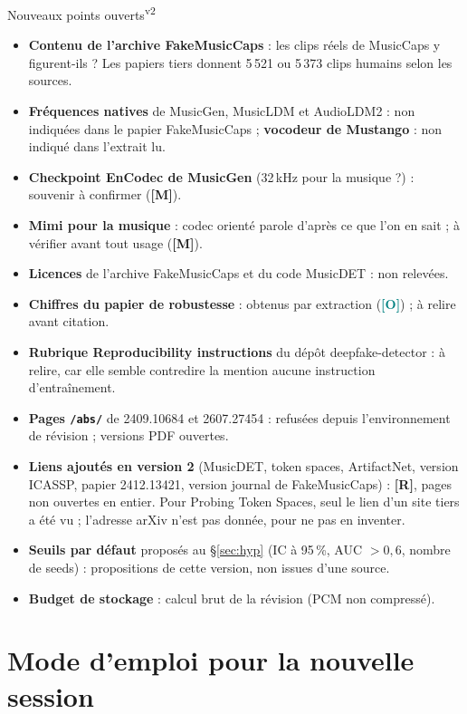 \documentclass[11pt,a4paper]{article}
\providecommand{\og}{\guillemotleft\nobreakspace}%
\providecommand{\fg}{\nobreakspace\guillemotright}}
\newcommand{\lO}{\textbf{\textcolor{teal}{[O]}}}
\newcommand{\lR}{\textbf{\textcolor{orange!80!black}{[R]}}}
\newcommand{\lM}{\textbf{\textcolor{red!70!black}{[M]}}}
\newcommand{\vtwot}{\textsuperscript{v2}}  %
\begin{document}
\begin{corr}{Nouveaux points ouverts\vtwot}
\begin{itemize}
\item \textbf{Contenu de l'archive FakeMusicCaps} : les clips réels de MusicCaps y figurent-ils ? Les papiers tiers donnent 5\,521 ou 5\,373 clips humains selon les sources.
\item \textbf{Fréquences natives} de MusicGen, MusicLDM et AudioLDM2 : non indiquées dans le papier FakeMusicCaps ; \textbf{vocodeur de Mustango} : non indiqué dans l'extrait lu.
\item \textbf{Checkpoint EnCodec de MusicGen} (32\,kHz pour la musique ?) : souvenir à confirmer (\lM).
\item \textbf{Mimi pour la musique} : codec orienté parole d'après ce que l'on en sait ; à vérifier avant tout usage (\lM).
\item \textbf{Licences} de l'archive FakeMusicCaps et du code MusicDET : non relevées.
\item \textbf{Chiffres du papier de robustesse} : obtenus par extraction (\lO) ; à relire avant citation.
\item \textbf{Rubrique \og{}Reproducibility instructions\fg{}} du dépôt deepfake-detector : à relire, car elle semble contredire la mention \og{}aucune instruction d'entraînement\fg{}.
\item \textbf{Pages \texttt{/abs/}} de 2409.10684 et 2607.27454 : refusées depuis l'environnement de révision ; versions PDF ouvertes.
\item \textbf{Liens ajoutés en version 2} (MusicDET, token spaces, ArtifactNet, version ICASSP, papier 2412.13421, version journal de FakeMusicCaps) : \lR, pages non ouvertes en entier. Pour \og{}Probing Token Spaces\fg{}, seul le lien d'un site tiers a été vu ; l'adresse arXiv n'est pas donnée, pour ne pas en inventer.
\item \textbf{Seuils par défaut} proposés au §\ref{sec:hyp} (IC à 95\,\%, AUC $>0{,}6$, nombre de seeds) : propositions de cette version, non issues d'une source.
\item \textbf{Budget de stockage} : calcul brut de la révision (PCM non compressé).
\end{itemize}
\end{corr}

\section{Mode d'emploi pour la nouvelle session}\label{sec:mode}
\end{document}
